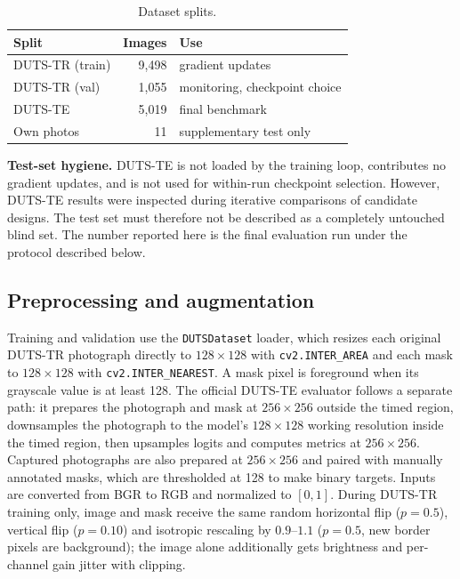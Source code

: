 \documentclass[10pt,a4paper,twocolumn]{article}
\begin{document}
\begin{table}[h]
\centering\small
\begin{tabular}{@{}lrl@{}}
\toprule
\textbf{Split} & \textbf{Images} & \textbf{Use}\\
\midrule
DUTS-TR (train) & 9{,}498 & gradient updates\\
DUTS-TR (val)   & 1{,}055 & monitoring, checkpoint choice\\
DUTS-TE         & 5{,}019 & final benchmark\\
Own photos      & 11 & supplementary test only\\
\bottomrule
\end{tabular}
\caption{Dataset splits.}
\end{table}

\textbf{Test-set hygiene.} DUTS-TE is not loaded by the training loop, contributes no gradient updates, and is not used for within-run checkpoint selection. However, DUTS-TE results were inspected during iterative comparisons of candidate designs. The test set must therefore not be described as a completely untouched blind set. The number reported here is the final evaluation run under the protocol described below.

\subsection{Preprocessing and augmentation}
Training and validation use the \texttt{DUTSDataset} loader, which resizes each original DUTS-TR photograph directly to $128{\times}128$ with \texttt{cv2.INTER\_AREA} and each mask to $128{\times}128$ with \texttt{cv2.INTER\_NEAREST}. A mask pixel is foreground when its grayscale value is at least 128. The official DUTS-TE evaluator follows a separate path: it prepares the photograph and mask at $256{\times}256$ outside the timed region, downsamples the photograph to the model's $128{\times}128$ working resolution inside the timed region, then upsamples logits and computes metrics at $256{\times}256$. Captured photographs are also prepared at $256{\times}256$ and paired with manually annotated masks, which are thresholded at 128 to make binary targets. Inputs are converted from BGR to RGB and normalized to $[0,1]$. During DUTS-TR training only, image and mask receive the same random horizontal flip ($p{=}0.5$), vertical flip ($p{=}0.10$) and isotropic rescaling by $0.9$--$1.1$ ($p{=}0.5$, new border pixels are background); the image alone additionally gets brightness and per-channel gain jitter with clipping.
\end{document}

